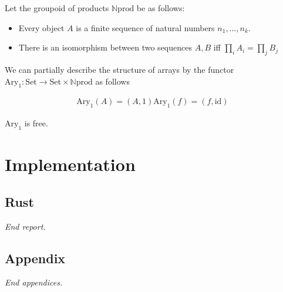 \documentclass{DIKU-report-variant}
\newcommand\brm[1]{\bm{\mathrm{#1}}}
\newcommand\Nat{\mathbb{N}}
\begin{document}
\begin{definition}
  Let the groupoid of products \(\Nat\brm{prod}\) be as follows:
  \begin{itemize}
    \item Every object \(A\) is a finite sequence of natural numbers \(n_1, \dots, n_k\).
    \item There is an isomorphism between two sequences \(A, B\) iff \(\prod_i A_i = \prod_j B_j\)
  \end{itemize}
\end{definition}

\begin{definition}
  We can partially describe the structure of arrays by the functor
  \(\brm{Ary}_1 : \brm{Set} \to \brm{Set} \times \Nat\brm{prod}\) as follows

  \begin{align*}
    \brm{Ary}_1 (A) = (A, 1)
    \brm{Ary}_1 (f) = (f, \mathrm{id})
  \end{align*}
\end{definition}

\begin{theorem}
  \(\brm{Ary}_1\) is free.
\end{theorem}

\chapter{Implementation}

\section{Rust}

\vfill
\begin{center}\itshape End report.\end{center}
\clearpage

\appendix
\renewcommand\thesection{\Alph{section}}
{}

\section{Appendix}

{}

\vfill
\begin{center}\itshape End appendices.\end{center}
\clearpage

\printbibliography[heading=subbibintoc]
\listoftables
\listoffigures
\printindex
\end{document}
